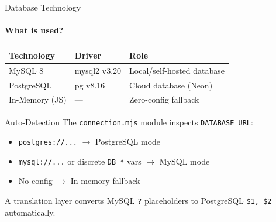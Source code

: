 \documentclass[aspectratio=169, 12pt]{beamer}
\begin{document}

\begin{frame}{Database Technology}
\framesubtitle{What is used?}

\begin{center}
\begin{tabular}{l l l}
\toprule
\textbf{Technology} & \textbf{Driver} & \textbf{Role} \\
\midrule
MySQL 8 & mysql2 v3.20 & Local/self-hosted database \\
PostgreSQL & pg v8.16 & Cloud database (Neon) \\
In-Memory (JS) & --- & Zero-config fallback \\
\bottomrule
\end{tabular}
\end{center}

\vspace{8pt}
\begin{block}{Auto-Detection}
The \texttt{connection.mjs} module inspects \texttt{DATABASE\_URL}:
\begin{itemize}\itemsep=1pt
    \item \texttt{postgres://...} $\rightarrow$ PostgreSQL mode
    \item \texttt{mysql://...} or discrete \texttt{DB\_*} vars $\rightarrow$ MySQL mode
    \item No config $\rightarrow$ In-memory fallback
\end{itemize}
A translation layer converts MySQL \texttt{?} placeholders to PostgreSQL \texttt{\$1, \$2} automatically.
\end{block}
\end{frame}
\end{document}
